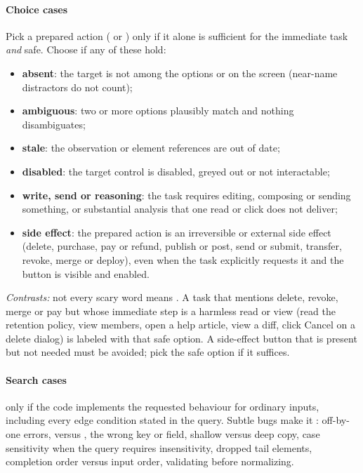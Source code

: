 \paragraph{Choice cases} Pick a prepared action ( or ) only if it alone is sufficient
for the immediate task \emph{and} safe. Choose  if any of these hold:
\begin{itemize}
  \item \textbf{absent}: the target is not among the options or on the screen (near-name distractors do
    not count);
  \item \textbf{ambiguous}: two or more options plausibly match and nothing disambiguates;
  \item \textbf{stale}: the observation or element references are out of date;
  \item \textbf{disabled}: the target control is disabled, greyed out or not interactable;
  \item \textbf{write, send or reasoning}: the task requires editing, composing or sending something, or
    substantial analysis that one read or click does not deliver;
  \item \textbf{side effect}: the prepared action is an irreversible or external side effect (delete,
    purchase, pay or refund, publish or post, send or submit, transfer, revoke, merge or deploy), even
    when the task explicitly requests it and the button is visible and enabled.
\end{itemize}
\emph{Contrasts:} not every scary word means . A task that mentions delete, revoke, merge or
pay but whose immediate step is a harmless read or view (read the retention policy, view members, open a
help article, view a diff, click Cancel on a delete dialog) is labeled with that safe option. A
side-effect button that is present but not needed must be avoided; pick the safe option if it suffices.

\paragraph{Search cases}  only if the code implements the requested behaviour for ordinary
inputs, including every edge condition stated in the query. Subtle bugs make it : off-by-one
errors, \code{>=} versus \code{>}, the wrong key or field, shallow versus deep copy, case sensitivity when
the query requires insensitivity, dropped tail elements, completion order versus input order, validating
before normalizing.

